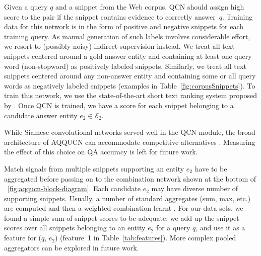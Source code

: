 \documentclass{svjour3}
\begin{document}
Given a query $q$ and a snippet from the Web corpus, QCN should assign high score to the pair if the snippet contains evidence to correctly answer~$q$.  Training data for this network is in the form of positive and negative snippets for each training query. As manual generation of such labels involves considerable effort, we resort to (possibly noisy) indirect supervision instead.  We treat all text snippets centered around a gold answer entity and containing at least one query word (non-stopword) as positively labeled snippets.  Similarly, we treat all text snippets centered around any non-answer entity and containing some or all query words as negatively labeled snippets (examples in Table~\ref{fig:corpusSnippets}).  To train this network, we use the state-of-the-art short text ranking system proposed by \cite{SeverynM2015SiamConvNet}.  Once QCN is trained, we have a score for each snippet belonging to a candidate answer entity $e_2 \in \mathcal{E}_2$.

While Siamese convolutional networks served well in the QCN module, the broad architecture of AQQUCN can accommodate competitive alternatives \citep{LvZ2009positional, PetkovaBC2007NamedEntityProximity, ZhiltsovKN2015FieldedSDM, hui2017pacrr}.  Measuring the effect of this choice on QA accuracy is left for future work.

Match signals from multiple snippets supporting an entity $e_2$ have to be aggregated before passing on to the combination network shown at the bottom of \figurename~\ref{fig:aqqucn-block-diagram}.  Each candidate $e_2$ may have diverse number of supporting snippets.  Usually, a number of standard aggregates (sum, max, etc.) are computed and then a weighted combination learnt \citep{BalogAdR2009LanguageModelExpert, MacdonaldO2006VotingExpert, SawantC2013Fader, JoshiSC2014KgCorpusJoint}.  For our data sets, we found a simple sum of snippet scores to be adequate: we add up the snippet scores over all snippets belonging to an entity $e_2$ for a query $q$, and use it as a feature for ($q$, $e_2$) (feature~1 in Table~\ref{tab:features}).  More complex pooled aggregators can be explored in future work.
\end{document}
